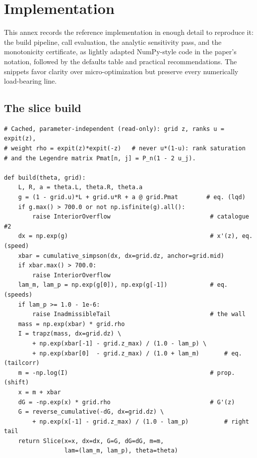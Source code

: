 \section{Implementation}
\label{app:implementation}

This annex records the reference implementation in enough detail to
reproduce it: the build pipeline, call evaluation, the analytic
sensitivity pass, and the monotonicity certificate, as lightly adapted
NumPy-style code in the paper's notation, followed by the defaults
table and practical recommendations.  The snippets favor clarity over
micro-optimization but preserve every numerically load-bearing line.

\subsection{The slice build}

\begin{lstlisting}[caption={One slice build: \(\theta\to(x,x',G,G')\) on
the fixed grid.  Comments give the paper's equation numbers.}]
# Cached, parameter-independent (read-only): grid z, ranks u = expit(z),
# weight rho = expit(z)*expit(-z)   # never u*(1-u): rank saturation
# and the Legendre matrix Pmat[n, j] = P_n(1 - 2 u_j).

def build(theta, grid):
    L, R, a = theta.L, theta.R, theta.a
    g = (1 - grid.u)*L + grid.u*R + a @ grid.Pmat        # eq. (lqd)
    if g.max() > 700.0 or not np.isfinite(g).all():
        raise InteriorOverflow                            # catalogue #2
    dx = np.exp(g)                                        # x'(z), eq. (speed)
    xbar = cumulative_simpson(dx, dx=grid.dz, anchor=grid.mid)
    if xbar.max() > 700.0:
        raise InteriorOverflow
    lam_m, lam_p = np.exp(g[0]), np.exp(g[-1])            # eq. (speeds)
    if lam_p >= 1.0 - 1e-6:
        raise InadmissibleTail                            # the wall
    mass = np.exp(xbar) * grid.rho
    I = trapz(mass, dx=grid.dz) \
        + np.exp(xbar[-1] - grid.z_max) / (1.0 - lam_p) \
        + np.exp(xbar[0]  - grid.z_max) / (1.0 + lam_m)       # eq. (tailcorr)
    m = -np.log(I)                                        # prop. (shift)
    x = m + xbar
    dG = -np.exp(x) * grid.rho                            # G'(z)
    G = reverse_cumulative(-dG, dx=grid.dz) \
        + np.exp(x[-1] - grid.z_max) / (1.0 - lam_p)          # right tail
    return Slice(x=x, dx=dx, G=G, dG=dG, m=m,
                 lam=(lam_m, lam_p), theta=theta)
\end{lstlisting}

